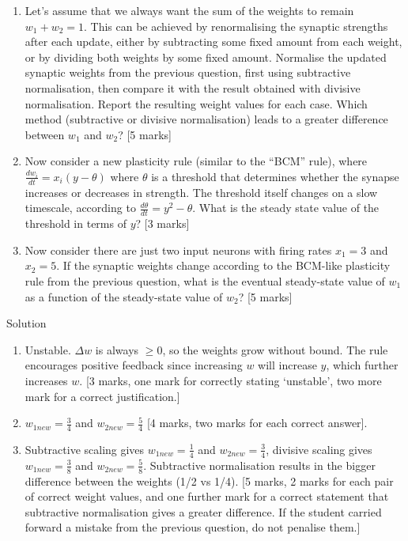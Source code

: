 \documentclass[a4paper,12pt]{article}
\newif\ifsoln
\begin{document}
\begin{enumerate}
\begin{enumerate}
\item Let's assume that we always want the sum of the weights to remain $w_1 + w_2 = 1$. This can be achieved by renormalising the synaptic strengths after each update, either by subtracting some fixed amount from each weight, or by dividing both weights by some fixed amount. Normalise the updated synaptic weights from the previous question, first using subtractive normalisation, then compare it with the result obtained with divisive normalisation. Report the resulting weight values for each case. Which method (subtractive or divisive normalisation) leads to a greater difference between $w_1$ and $w_2$? [5 marks]

 

\item Now consider a new plasticity rule (similar to the ``BCM'' rule), where $\frac{dw_i}{dt} = x_i(y-\theta)$ where $\theta$ is a threshold that determines whether the synapse increases or decreases in strength. The threshold itself changes on a slow timescale, according to $\frac{d \theta}{dt} = y^2 - \theta$. What is the steady state value of the threshold in terms of $y$? [3 marks]

 

\item Now consider there are just two input neurons with firing rates $x_1 = 3$ and $x_2 = 5$. If the synaptic weights change according to the BCM-like plasticity rule from the previous question, what is the eventual steady-state value of $w_1$ as a function of the steady-state value of $w_2$? [5 marks]

 

\end{enumerate}

\ifsoln Solution

\begin{enumerate}

\item Unstable. $\Delta w$ is always $\geq 0$, so the weights grow without bound. The rule encourages positive feedback since increasing $w$ will increase $y$, which further increases $w$. [3 marks, one mark for correctly stating `unstable', two more mark for a correct justification.]

\item $w_{1new} = \frac{3}{4}$ and $w_{2new} = \frac{5}{4}$ [4 marks, two marks for each correct answer].

\item Subtractive scaling gives $w_{1new} = \frac{1}{4}$ and $w_{2new} = \frac{3}{4}$, divisive scaling gives $w_{1new} = \frac{3}{8}$ and $w_{2new} = \frac{5}{8}$. Subtractive normalisation results in the bigger difference between the weights (1/2 vs 1/4). [5 marks, 2 marks for each pair of correct weight values, and one further mark for a correct statement that subtractive normalisation gives a greater difference. If the student carried forward a mistake from the previous question, do not penalise them.]


\end{enumerate}
\end{enumerate}
\end{document}
